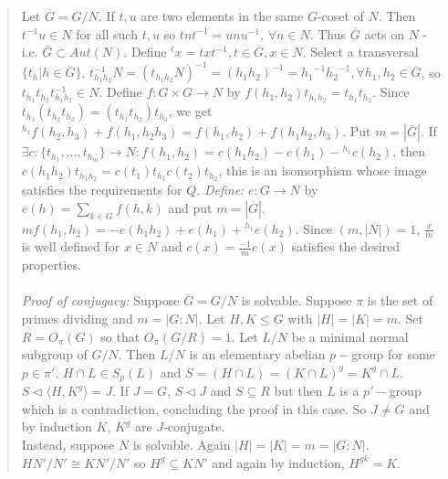 \begin{quote}
Let $\overline{G}= G/N$.  If $t, u$ are two elements in
the same $G$-coset of $N$.
Then $t^{-1}u \in N$ for all such $t, u$
so $tnt^{-1}=unu^{-1}$, $\forall n \in N$.
Thus $\overline{G}$ acts on $N$ - i.e. $\overline{G} \subset Aut(N)$.
Define $^tx=txt^{-1}, t \in G, x \in N$.
Select a transversal $\{t_{h} | h \in \overline{G}\}$.
$t^{-1}_{h_1 h_2}N = (t_{h_1h_2}N)^{-1}=
(h_1h_2)^{-1} = {h_1}^{-1}{h_2}^{-1}, \forall h_1 , h_2 \in \overline{G}$, so 
$t_{h_1}t_{h_2} t^{-1}_{h_1 h_2} \in N$.
Define $f: G \times G \rightarrow N$ by
$f(h_1, h_2) t_{h_1 h_2} = t_{h_1} t_{h_2}$.  Since
$t_{h_1}(t_{h_2} t_{h_3}) = (t_{h_1}t_{h_2}) t_{h_3}$, we get
$ {^{h_1}} f(h_2, h_3)+ f(h_1, h_2 h_3)= f(h_1, h_2)+ f(h_1 h_2 , h_3)$.
Put $m= |\overline{G}|$.  If 
$\exists c:\{t_{h_1}, \ldots , t_{h_m}\} \rightarrow N: 
f(h_1 , h_2)= c(h_1 h_2) -c(h_1) - {^{h_1}} c(h_2)$, then
$c(h_1 h_2) t_{h_1 h_2}= c(t_1)t_{h_1} c(t_2) t_{h_2}$, this is an isomorphism
whose image satisfies the requirements for $Q$.  
\emph{Define:} $e: G \rightarrow N$ by
$e(h) = \sum_{k \in \overline{G}} f(h , k)$ and put $m= |\overline{G}|$.
$m f( h_1 , h_2 )=  -e(h_1 h_2) + e(h_1) + {^{h_1}}e(h_2)$.  Since $(m, |N|)=1$,
${\frac x m}$ is well defined for $ x \in N$ and
$c(x)= {\frac {-1} m} e(x)$ satisfies the desired properties.
\\
\\
\emph{Proof of conjugacy:}
Suppose $\overline{G}=G/N$ is solvable. Suppose $\pi$ is the set of primes 
dividing and $m=|G:N|$. Let $H,K \le G$ with $|H|=|K|=m$.  
Set $R=O_{\pi}(G)$ so that $O_{\pi}(G/R) = 1$.  
Let $L/N$ be a minimal
normal subgroup of $G/N$.
Then $L/N$ is an elementary abelian $p-$group for some $p \in \pi'$.
$H\cap L \in S_p(L)$ and
$S=(H \cap L)=(K \cap L)^g= K^g \cap L$.
$S \lhd \langle H, K^g \rangle = J$.  
If $J = G$, $S \lhd J$ and
$S \subseteq R$ but then $L$ is a $p'-$group which is a contradiction,
concluding the proof in this case.  So
$J \ne G$ and by induction $K$, $K^g$ are $J$-conjugate.  
\\
Instead, suppose
$N$ is solvable.  Again $|H|=|K|=m=|G:N|$.  
$HN'/N' \cong KN'/N'$ so $H^g \subseteq KN'$ and
again by induction, $H^{gk}= K$.
\end{quote}
